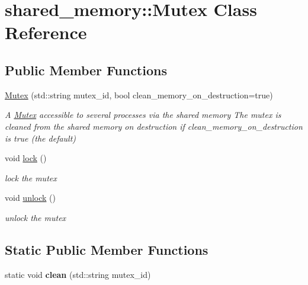 \hypertarget{classshared__memory_1_1Mutex}{}\section{shared\+\_\+memory\+:\+:Mutex Class Reference}
\label{classshared__memory_1_1Mutex}
\subsection*{Public Member Functions}
\begin{DoxyCompactItemize}
\item 
\hyperlink{classshared__memory_1_1Mutex_a8f1b1cffa2f3bdfb8cd74cf61b0df650}{Mutex} (std\+::string mutex\+\_\+id, bool clean\+\_\+memory\+\_\+on\+\_\+destruction=true)\hypertarget{classshared__memory_1_1Mutex_a8f1b1cffa2f3bdfb8cd74cf61b0df650}{}\label{classshared__memory_1_1Mutex_a8f1b1cffa2f3bdfb8cd74cf61b0df650}

\begin{DoxyCompactList}\small\item\em A \hyperlink{classshared__memory_1_1Mutex}{Mutex} accessible to several processes via the shared memory The mutex is cleaned from the shared memory on destruction if clean\+\_\+memory\+\_\+on\+\_\+destruction is true (the default) \end{DoxyCompactList}\item 
void \hyperlink{classshared__memory_1_1Mutex_a6b6ca2e15d379a5e3a8d68d15c04469f}{lock} ()\hypertarget{classshared__memory_1_1Mutex_a6b6ca2e15d379a5e3a8d68d15c04469f}{}\label{classshared__memory_1_1Mutex_a6b6ca2e15d379a5e3a8d68d15c04469f}

\begin{DoxyCompactList}\small\item\em lock the mutex \end{DoxyCompactList}\item 
void \hyperlink{classshared__memory_1_1Mutex_a06b9e214880af7ab9703bd78601ac0c6}{unlock} ()\hypertarget{classshared__memory_1_1Mutex_a06b9e214880af7ab9703bd78601ac0c6}{}\label{classshared__memory_1_1Mutex_a06b9e214880af7ab9703bd78601ac0c6}

\begin{DoxyCompactList}\small\item\em unlock the mutex \end{DoxyCompactList}\end{DoxyCompactItemize}
\subsection*{Static Public Member Functions}
\begin{DoxyCompactItemize}
\item 
static void {\bfseries clean} (std\+::string mutex\+\_\+id)\hypertarget{classshared__memory_1_1Mutex_a964e89132bb180569edcf52de5b43978}{}\label{classshared__memory_1_1Mutex_a964e89132bb180569edcf52de5b43978}

\end{DoxyCompactItemize}
